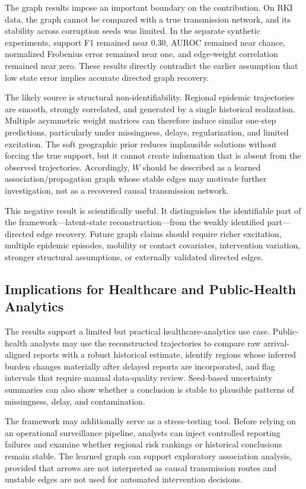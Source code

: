 The graph results impose an important boundary on the contribution. On RKI data, the graph cannot be compared with a true transmission network, and its stability across corruption seeds was limited. In the separate synthetic experiments, support F1 remained near $0.30$, AUROC remained near chance, normalized Frobenius error remained near one, and edge-weight correlation remained near zero. These results directly contradict the earlier assumption that low state error implies accurate directed graph recovery.

The likely source is structural non-identifiability. Regional epidemic trajectories are smooth, strongly correlated, and generated by a single historical realization. Multiple asymmetric weight matrices can therefore induce similar one-step predictions, particularly under missingness, delays, regularization, and limited excitation. The soft geographic prior reduces implausible solutions without forcing the true support, but it cannot create information that is absent from the observed trajectories. Accordingly, $W$ should be described as a learned association/propagation graph whose stable edges may motivate further investigation, not as a recovered causal transmission network.

This negative result is scientifically useful. It distinguishes the identifiable part of the framework---latent-state reconstruction---from the weakly identified part---directed edge recovery. Future graph claims should require richer excitation, multiple epidemic episodes, mobility or contact covariates, intervention variation, stronger structural assumptions, or externally validated directed edges.

\subsection{Implications for Healthcare and Public-Health Analytics}
\label{subsec:healthcare_implications}

The results support a limited but practical healthcare-analytics use case. Public-health analysts may use the reconstructed trajectories to compare raw arrival-aligned reports with a robust historical estimate, identify regions whose inferred burden changes materially after delayed reports are incorporated, and flag intervals that require manual data-quality review. Seed-based uncertainty summaries can also show whether a conclusion is stable to plausible patterns of missingness, delay, and contamination.

The framework may additionally serve as a stress-testing tool. Before relying on an operational surveillance pipeline, analysts can inject controlled reporting failures and examine whether regional risk rankings or historical conclusions remain stable. The learned graph can support exploratory association analysis, provided that arrows are not interpreted as causal transmission routes and unstable edges are not used for automated intervention decisions.

